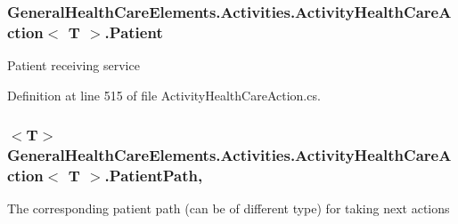 \subsubsection[{\texorpdfstring{Patient}{Patient}}]{ {\bf General\+Health\+Care\+Elements.\+Activities.\+Activity\+Health\+Care\+Action}$<$ T $>$.Patient\hspace{0.3cm}{\ttfamily [get]}}\hypertarget{class_general_health_care_elements_1_1_activities_1_1_activity_health_care_action_ac16540d0fe7df6198e2792b2367775e1}{}\label{class_general_health_care_elements_1_1_activities_1_1_activity_health_care_action_ac16540d0fe7df6198e2792b2367775e1}


Patient receiving service 



Definition at line 515 of file Activity\+Health\+Care\+Action.\+cs.

\subsubsection[{\texorpdfstring{Patient\+Path}{PatientPath}}]{$<$T$>$ {\bf General\+Health\+Care\+Elements.\+Activities.\+Activity\+Health\+Care\+Action}$<$ T $>$.{\bf Patient\+Path}\hspace{0.3cm}{\ttfamily [get]}, {\ttfamily [set]}}\hypertarget{class_general_health_care_elements_1_1_activities_1_1_activity_health_care_action_a566124f1689c521e6eeb49c5c0645d0e}{}\label{class_general_health_care_elements_1_1_activities_1_1_activity_health_care_action_a566124f1689c521e6eeb49c5c0645d0e}


The corresponding patient path (can be of different type) for taking next actions 



